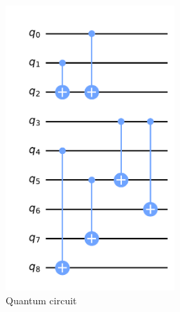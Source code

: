 \begin{figure}[ht]
    \centering
    \hfill
    \begin{subfigure}[b]{0.38\linewidth}
        \includegraphics[width=0.7\textwidth]{figures/qroute/supp_circuit_init.pdf}
        \caption{Quantum circuit\label{fig:appendix-orig_circ}}
    \end{subfigure}
    \hfill
    \begin{subfigure}[b]{0.38\linewidth}

\end{subfigure}
\end{figure}
